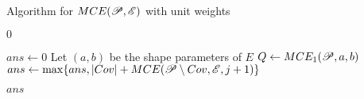 \begin{algoritmo}
    \caption{Algorithm for $MCE(\mathscr{P}, \mathscr{E})$ with unit weights}\label{algoritmo:mce}
    \begin{algorithmic}[1]
        
        \item[]
        
        \State \Return $0$
        \EndIf
        
        \State $ans \gets 0$
        \State Let $(a,b)$ be the shape parameters of $E$
        \State $Q \gets MCE_1(\mathscr{P}, a, b)$
        \State $ans \gets \max\{ans, |Cov| + MCE(\mathscr{P} \setminus Cov, \mathscr{E}, j+1)\}$ 
        \EndFor
        \EndFor
        
        \State \Return $ans$
        \EndProcedure
    \end{algorithmic}
\end{algoritmo}
 